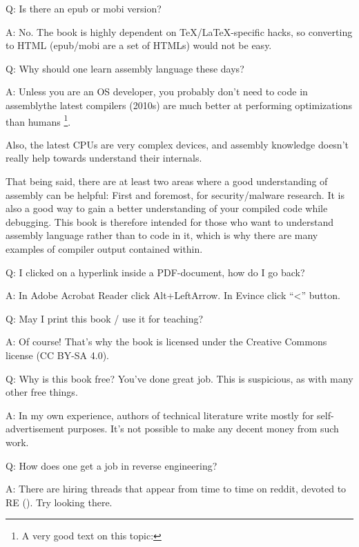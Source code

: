 \par Q: Is there an epub or mobi version?
\par A: No. The book is highly dependent on TeX/LaTeX-specific hacks, so converting to HTML (epub/mobi are a set of HTMLs)
would not be easy.

\par Q: Why should one learn assembly language these days?
\par A: Unless you are an \ac{OS} developer, you probably don't need to code in assembly\textemdash{}the latest compilers (2010s) are much better at performing optimizations than humans \footnote{A very good text on this topic: \InSqBrackets{\AgnerFog}}.

Also, the latest \ac{CPU}s are very complex devices, and assembly knowledge doesn't really help towards understand their internals.

That being said, there are at least two areas where a good understanding of assembly can be helpful:
First and foremost, for security/malware research. It is also a good way to gain a better understanding of your compiled code while debugging.
This book is therefore intended for those who want to understand assembly language rather
than to code in it, which is why there are many examples of compiler output contained within.

\par Q: I clicked on a hyperlink inside a PDF-document, how do I go back?
\par A: In Adobe Acrobat Reader click Alt+LeftArrow. In Evince click ``<'' button.

\par Q: May I print this book / use it for teaching?
\par A: Of course! That's why the book is licensed under the Creative Commons license (CC BY-SA 4.0).

\par Q: Why is this book free? You've done great job. This is suspicious, as with many other free things.
\par A: In my own experience, authors of technical literature write mostly for self-advertisement purposes. It's not possible to make any decent money from such work.

\par Q: How does one get a job in reverse engineering?
\par A: There are hiring threads that appear from time to time on reddit, devoted to RE\FNURLREDDIT{}
(\RedditHiringThread{}).
Try looking there.

